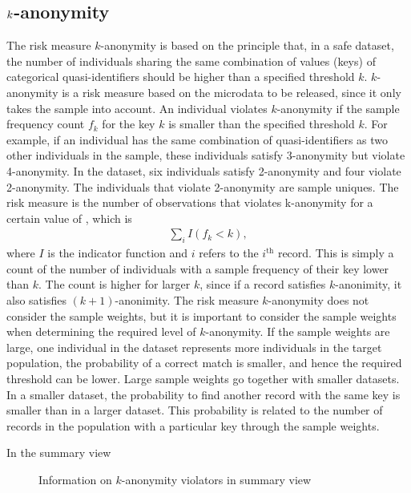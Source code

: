 \documentclass[letterpaper,10pt,english]{sphinxmanual}
\begin{document}
\subsection{\protect\(k\protect\)-anonymity}
\label{\detokenize{risk:anonymity}}
The risk measure \(k\)-anonymity is based on the principle that, in a safe
dataset, the number of individuals sharing the same combination of
values (keys) of categorical quasi-identifiers should be higher than a
specified threshold \(k\). \(k\)-anonymity is a risk
measure based on the microdata to be released, since it only takes the
sample into account. An individual violates \(k\)-anonymity if the
sample frequency count \(f_{k}\) for the key \(k\) is smaller
than the specified threshold \(k\). For example, if an
individual has the same combination of quasi-identifiers as two other
individuals in the sample, these individuals satisfy 3-anonymity but
violate 4-anonymity. In the dataset, six individuals
satisfy 2-anonymity and four violate 2-anonymity. The individuals that
violate 2-anonymity are sample uniques. The risk measure is the number
of observations that violates k-anonymity for a certain value of ,
which is
\begin{equation*}
\begin{split}\sum_{i}^{}{I(f_{k} < k)},\end{split}
\end{equation*}
where \(I\) is the indicator function and \(i\) refers to the
\(i\)$^{\text{th}}$ record. This is simply a count of the number of
individuals with a sample frequency of their key lower than \(k\).
The count is higher for larger \(k\), since if a record satisfies
\(k\)-anonimity, it also satisfies \((k + 1)\)-anonimity. The
risk measure \(k\)-anonymity does not consider the sample weights,
but it is important to consider the sample weights when determining the
required level of \(k\)-anonymity. If the sample weights are large,
one individual in the dataset represents more individuals in the target
population, the probability of a correct match is smaller, and hence the
required threshold can be lower. Large sample weights go together with
smaller datasets. In a smaller dataset, the probability to find another
record with the same key is smaller than in a larger dataset. This
probability is related to the number of records in the population with a
particular key through the sample weights.

In the summary view

\begin{figure}[htbp]
\centering
\capstart

\noindent{}
\caption{Information on \(k\)-anonymity violators in summary view}\label{\detokenize{risk:fig71}}\label{\detokenize{risk:id2}}\end{figure}
\end{document}

